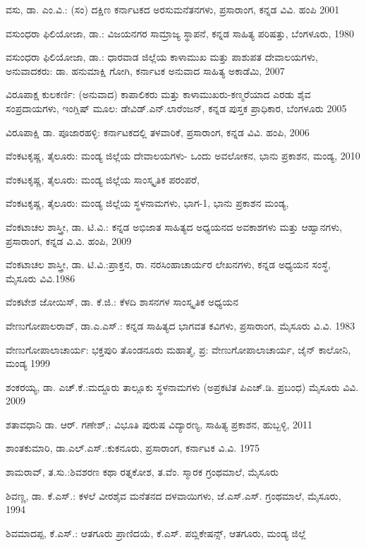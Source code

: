 \noindent
ವಸು, ಡಾ. ಎಂ.ವಿ.: (ಸಂ) ದಕ್ಷಿಣ ಕರ್ನಾಟಕದ ಅರಸುಮನೆತನಗಳು, ಪ್ರಸಾರಾಂಗ, ಕನ್ನಡ ವಿವಿ. ಹಂಪಿ 2001

\noindent
ವಸುಂಧರಾ ಫಿಲಿಯೋಜಾ, ಡಾ.: ವಿಜಯನಗರ ಸಾಮ್ರಾಜ್ಯ ಸ್ಥಾಪನೆ, ಕನ್ನಡ ಸಾಹಿತ್ಯ ಪರಿಷತ್ತು, ಬೆಂಗಳೂರು, 1980

\noindent
ವಸುಂಧರಾ ಫಿಲಿಯೋಜಾ, ಡಾ.: ಧಾರವಾಡ ಜಿಲ್ಲೆಯ ಕಾಳಾಮುಖ ಮತ್ತು ಪಾಶುಪತ ದೇವಾಲಯಗಳು, ಅನುವಾದಕರು: ಡಾ. ಹನುಮಾಕ್ಷಿ ಗೋಗಿ, ಕರ್ನಾಟಕ ಅನುವಾದ ಸಾಹಿತ್ಯ ಅಕಾಡೆಮಿ, 2007

\noindent
ವಿರೂಪಾಕ್ಷ ಕುಲಕರ್ಣಿ: (ಅನುವಾದ) ಕಾಪಾಲಿಕರು ಮತ್ತು ಕಾಳಾಮುಖರು-ಕಣ್ಮರೆಯಾದ ಎರಡು ಶೈವ ಸಂಪ್ರದಾಯಗಳು, ಇಂಗ್ಲಿಷ್​ ಮೂಲ: ಡೇವಿಡ್​.ಎನ್​.ಲಾರೆಂಜನ್​, ಕನ್ನಡ ಪುಸ್ತಕ ಪ್ರಾಧಿಕಾರ, ಬೆಂಗಳೂರು 2005

\noindent
ವಿರೂಪಾಕ್ಷಿ ಡಾ. ಪೂಜಾರಹಳ್ಳಿ: ಕರ್ನಾಟಕದಲ್ಲಿ ತಳವಾರಿಕೆ, ಪ್ರಸಾರಾಂಗ, ಕನ್ನಡ ವಿವಿ. ಹಂಪಿ, 2006

\noindent
ವೆಂಕಟಕೃಷ್ಣ, ತೈಲೂರು: ಮಂಡ್ಯ ಜಿಲ್ಲೆಯ ದೇವಾಲಯಗಳು- ಒಂದು ಅವಲೋಕನ, ಭಾನು ಪ್ರಕಾಶನ, ಮಂಡ್ಯ, 2010

\noindent
ವೆಂಕಟಕೃಷ್ಣ, ತೈಲೂರು: ಮಂಡ್ಯ ಜಿಲ್ಲೆಯ ಸಾಂಸ್ಕೃತಿಕ ಪರಂಪರೆ,

\noindent
ವೆಂಕಟಕೃಷ್ಣ, ತೈಲೂರು: ಮಂಡ್ಯ ಜಿಲ್ಲೆಯ ಸ್ಥಳನಾಮಗಳು, ಭಾಗ-1, ಭಾನು ಪ್ರಕಾಶನ ಮಂಡ್ಯ,

\noindent
ವೆಂಕಟಾಚಲ ಶಾಸ್ತ್ರೀ, ಡಾ. ಟಿ.ವಿ.: ಕನ್ನಡ ಅಭಿಜಾತ ಸಾಹಿತ್ಯದ ಅಧ್ಯಯನದ ಅವಕಾಶಗಳು ಮತ್ತು ಆಹ್ವಾನಗಳು, ಪ್ರಸಾರಾಂಗ, ಕನ್ನಡ ವಿ.ವಿ. ಹಂಪಿ, 2009

\noindent
ವೆಂಕಟಾಚಲ ಶಾಸ್ತ್ರೀ, ಡಾ. ಟಿ.ವಿ.:ಪ್ರಾಕ್ತನ, ರಾ. ನರಸಿಂಹಾಚಾರ್ಯರ ಲೇಖನಗಳು, ಕನ್ನಡ ಅಧ್ಯಯನ ಸಂಸ್ಥೆ, ಮೈಸೂರು ವಿವಿ.1986

\noindent
ವೆಂಕಟೇಶ ಜೋಯಿಸ್​, ಡಾ. ಕೆ.ಜಿ.: ಕೆಳದಿ ಶಾಸನಗಳ ಸಾಂಸ್ಕೃತಿಕ ಅಧ್ಯಯನ

\noindent
ವೇಣುಗೋಪಾಲರಾವ್​, ಡಾ.ಎ.ಎಸ್​.: ಕನ್ನಡ ಸಾಹಿತ್ಯದ ಭಾಗವತ ಕವಿಗಳು, ಪ್ರಸಾರಾಂಗ, ಮೈಸೂರು ವಿ.ವಿ. 1983

\noindent
ವೇಣುಗೋಪಾಲಾಚಾರ್ಯ: ಭಕ್ತಪುರಿ ತೊಂಡನೂರು ಮಹಾತ್ಮೆ, ಪ್ರ: ವೇಣುಗೋಪಾಲಾಚಾರ್ಯ, ಜೈನ್​ ಕಾಲೋನಿ, ಮಂಡ್ಯ 1999

\noindent
ಶಂಕರಯ್ಯ, ಡಾ. ಎಚ್​.ಕೆ.:ಮದ್ದೂರು ತಾಲ್ಲೂಕು ಸ್ಥಳನಾಮಗಳು (ಅಪ್ರಕಟಿತ ಪಿಎಚ್​.ಡಿ. ಪ್ರಬಂಧ) ಮೈಸೂರು ವಿವಿ. 2009

\noindent
ಶತಾವಧಾನಿ ಡಾ. ಆರ್​. ಗಣೇಶ್​,: ವಿಭೂತಿ ಪುರುಷ ವಿದ್ಯಾರಣ್ಯ, ಸಾಹಿತ್ಯ ಪ್ರಕಾಶನ, ಹುಬ್ಬಳ್ಳಿ, 2011

\noindent
ಶಾಂತಕುಮಾರಿ, ಡಾ.ಎಲ್​.ಎಸ್​.:ಕುಕನೂರು, ಪ್ರಸಾರಾಂಗ, ಕರ್ನಾಟಕ ವಿ.ವಿ. 1975

\noindent
ಶಾಮರಾವ್​, ತ.ಸು.:ಶಿವಶರಣ ಕಥಾ ರತ್ನಕೋಶ, ತ.ವೆಂ. ಸ್ಮಾರಕ ಗ್ರಂಥಮಾಲೆ, ಮೈಸೂರು

\noindent
ಶಿವಣ್ಣ, ಡಾ. ಕೆ.ಎಸ್​.: ಕಳಲೆ ವೀರಶೈವ ಮನೆತನದ ದಳವಾಯಿಗಳು, ಜೆ.ಎಸ್​.ಎಸ್​. ಗ್ರಂಥಮಾಲೆ, ಮೈಸೂರು, 1994

\noindent
ಶಿವಮಾದಪ್ಪ, ಕೆ.ಎಸ್​.: ಆತಗೂರು ಪ್ರಾಣಿದಯೆ, ಕೆ.ಎಸ್​. ಪಬ್ಲಿಕೇಷನ್ಸ್​, ಆತಗೂರು, ಮಂಡ್ಯ ಜಿಲ್ಲೆ

